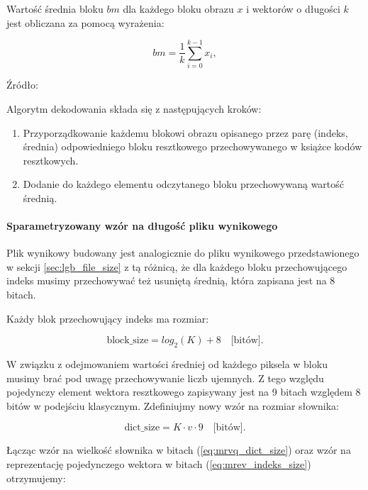 \documentclass{article}
\begin{document}
Wartość średnia bloku $bm$ dla każdego bloku obrazu $x$ i wektorów o długości $k$ jest obliczana za pomocą wyrażenia: 

\begin{equation}
  bm = \frac{1}{k} \sum_{i=0}^{k-1} x_{i},
\end{equation}

Źródło: \cite{meanremovedVQ}

Algorytm dekodowania składa się z następujących kroków:

\begin{enumerate}
  \item Przyporządkowanie każdemu blokowi obrazu opisanego przez parę (indeks, średnia) odpowiedniego bloku resztkowego przechowywanego w książce kodów resztkowych.
  \item Dodanie do każdego elementu odczytanego bloku przechowywaną wartość średnią.
\end{enumerate}

\paragraph{Sparametryzowany wzór na długość pliku wynikowego}

Plik wynikowy budowany jest analogicznie do pliku wynikowego przedstawionego w sekcji \ref{sec:lgb_file_size} z tą różnicą, że dla każdego bloku przechowującego indeks musimy przechowywać też usuniętą średnią, która zapisana jest na $8$ bitach.

Każdy blok przechowujący indeks ma rozmiar:

\begin{equation}
  \textrm{block\_size} = log_2(K) + 8 \quad  \textrm{[bitów]}.
  \label{eq:mrev_indeks_size}
\end{equation}

W związku z odejmowaniem wartości średniej od każdego piksela w bloku musimy brać pod uwagę przechowywanie liczb ujemnych. Z tego względu pojedynczy element wektora resztkowego zapisywany jest na 9 bitach względem 8 bitów w podejściu klasycznym. Zdefiniujmy nowy wzór na rozmiar słownika:

\begin{equation}
  \textrm{dict\_size} = K \cdot v \cdot 9 \quad \textrm{[bitów]}.
  \label{eq:mrvq_dict_size}
\end{equation}

Łącząc wzór na wielkość słownika w bitach (\ref{eq:mrvq_dict_size}) oraz wzór na reprezentację pojedynczego wektora w bitach (\ref{eq:mrev_indeks_size}) otrzymujemy:
\end{document}
